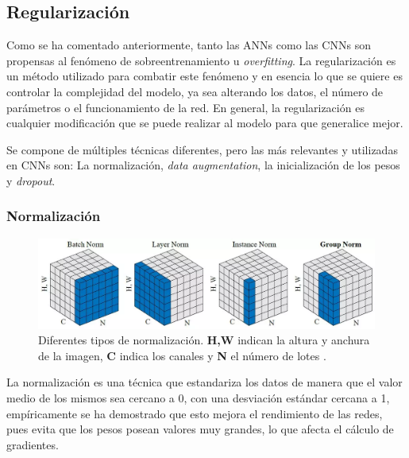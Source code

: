 \subsection{Regularización}
\label{subsection:regularization}
Como se ha comentado anteriormente, tanto las ANNs como las CNNs son propensas al fenómeno de sobreentrenamiento u \textit{overfitting}. La regularización es un método utilizado para combatir este fenómeno y en esencia lo que se quiere es controlar la complejidad del modelo, ya sea alterando los datos, el número de parámetros o el funcionamiento de la red. En general, la regularización es cualquier modificación que se puede realizar al modelo para que generalice mejor.

Se compone de múltiples técnicas diferentes, pero las más relevantes y utilizadas en CNNs son: La normalización, \textit{data augmentation}, la inicialización de los pesos y \textit{dropout}.

\subsubsection{Normalización}

\begin{figure}[h]
    \centering
    \includegraphics[width=\linewidth]{imagenes/theory/normTypes.png}
    \caption[Tipos de normalización]{Diferentes tipos de normalización. \textbf{H,W} indican la altura y anchura de la imagen, \textbf{C} indica los canales y \textbf{N} el número de lotes \cite{wu2018group}.}
    \label{fig:normTypes}
\end{figure}

La normalización es una técnica que estandariza los datos de manera que el valor medio de los mismos sea cercano a 0, con una desviación estándar cercana a 1, empíricamente se ha demostrado que esto mejora el rendimiento de las redes, pues evita que los pesos posean valores muy grandes, lo que afecta el cálculo de gradientes. 

